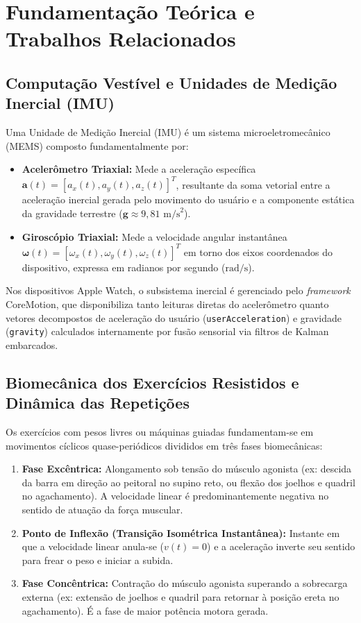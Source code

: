 \documentclass[12pt,openany,oneside,a4paper,english,brazil]{abntex2}
\begin{document}
\chapter{Fundamentação Teórica e Trabalhos Relacionados}

\section{Computação Vestível e Unidades de Medição Inercial (IMU)}
Uma Unidade de Medição Inercial (IMU) é um sistema microeletromecânico (MEMS) composto fundamentalmente por:
\begin{itemize}
    \item \textbf{Acelerômetro Triaxial:} Mede a aceleração específica $\mathbf{a}(t) = [a_x(t), a_y(t), a_z(t)]^T$, resultante da soma vetorial entre a aceleração inercial gerada pelo movimento do usuário e a componente estática da gravidade terrestre ($\mathbf{g} \approx 9{,}81\text{ m/s}^2$).
    \item \textbf{Giroscópio Triaxial:} Mede a velocidade angular instantânea $\boldsymbol{\omega}(t) = [\omega_x(t), \omega_y(t), \omega_z(t)]^T$ em torno dos eixos coordenados do dispositivo, expressa em radianos por segundo ($\text{rad/s}$).
\end{itemize}

Nos dispositivos Apple Watch, o subsistema inercial é gerenciado pelo \textit{framework} CoreMotion, que disponibiliza tanto leituras diretas do acelerômetro quanto vetores decompostos de aceleração do usuário (\texttt{userAcceleration}) e gravidade (\texttt{gravity}) calculados internamente por fusão sensorial via filtros de Kalman embarcados.

\section{Biomecânica dos Exercícios Resistidos e Dinâmica das Repetições}
Os exercícios com pesos livres ou máquinas guiadas fundamentam-se em movimentos cíclicos quase-periódicos divididos em três fases biomecânicas:
\begin{enumerate}
    \item \textbf{Fase Excêntrica:} Alongamento sob tensão do músculo agonista (ex: descida da barra em direção ao peitoral no supino reto, ou flexão dos joelhos e quadril no agachamento). A velocidade linear é predominantemente negativa no sentido de atuação da força muscular.
    \item \textbf{Ponto de Inflexão (Transição Isométrica Instantânea):} Instante em que a velocidade linear anula-se ($v(t) = 0$) e a aceleração inverte seu sentido para frear o peso e iniciar a subida.
    \item \textbf{Fase Concêntrica:} Contração do músculo agonista superando a sobrecarga externa (ex: extensão de joelhos e quadril para retornar à posição ereta no agachamento). É a fase de maior potência motora gerada.
\end{enumerate}
\end{document}
